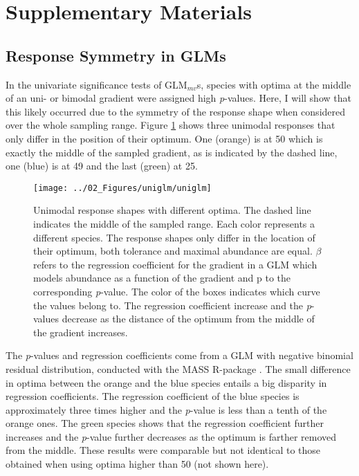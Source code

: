 
\section{Supplementary Materials}


	\subsection{Response Symmetry in GLMs}
		\normalsize
		In the univariate significance tests of  GLM$_{mv}$s, species with optima at the middle of an uni- or bimodal gradient were assigned high \textit{p}-values. 
		Here, I will show that this likely occurred due to the symmetry of the response shape when considered over the whole sampling range. 
		Figure \ref{fig:uniglm} shows three unimodal responses that only differ in the position of their optimum. One (orange) is at 50 which is exactly the middle of the sampled gradient, as is indicated by the dashed line, one (blue) is at 49 and the last (green) at 25. 
		
		
		\begin{figure}[h!]
			\centering
			\texttt{[image: ../02\_Figures/uniglm/uniglm]}
			\caption{
					Unimodal response shapes with different optima.
					The dashed line indicates the middle of the sampled range.
					Each color represents a different species.
					The response shapes only differ in the location of their optimum, both tolerance and maximal abundance are equal.
					$\beta$ refers to the regression coefficient for the gradient in a GLM which models abundance as a function of the gradient and p to the corresponding \textit{p}-value.
					The color of the boxes indicates which curve the values belong to.
					The regression coefficient increase and the \textit{p}-values decrease as the distance of the optimum from the middle of the gradient increases.  
					}
			\label{fig:uniglm}
		\end{figure}
		   
		The \textit{p}-values and regression coefficients come from a GLM with negative binomial residual distribution, conducted with the MASS R-package \citep{Venables2002}.
		The small difference in optima between the orange and the blue species entails a big disparity in regression coefficients. 
		The regression coefficient of the blue species is approximately three times higher and the \textit{p}-value is less than a tenth of the orange ones.
		The green species shows that the regression coefficient further increases and the \textit{p}-value further decreases as the optimum is farther removed from the middle. 
		These results were comparable but not identical to those obtained when using optima higher than 50 (not shown here).\\
		
